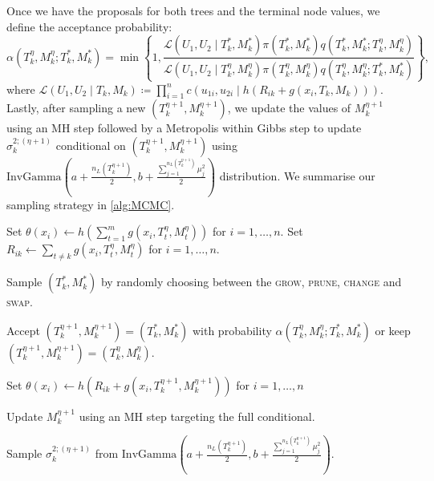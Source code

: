 \documentclass[
12pt]{article}
\begin{document}
	Once we have the proposals for both trees and the terminal node values, we define the acceptance probability:
	\begin{equation}\label{eq:acc:prob}
		\alpha\left(T_k^{\eta},M_k^{\eta};T_k^{\ast}, M_k^{\ast}\right)
		= \min\left\{1,\frac{\mathcal{L}(U_1,U_2\mid T_k^{\ast},M_k^{\ast})\pi(T_k^{\ast},M_k^{\ast})q\left(T_k^{\ast}, M_k^{\ast};T_k^{\eta},M_k^{\eta}\right)}
		{\mathcal{L}(U_1,U_2\mid T_k^{\eta},M_k^{\eta})\pi(T_k^{\eta},M_k^{\eta}) q\left(T_k^{\eta},M_k^{\eta};T_k^{\ast}, M_k^{\ast}\right)}\right\},
	\end{equation}
	where $\mathcal{L}(U_1,U_2\mid T_k, M_{k})\coloneqq \prod_{i=1}^{n}c\left(u_{1i},u_{2i}\mid h\left(R_{ik}+g(x_i, T_k, M_k)\right)\right)$. Lastly, after sampling a new $(T_k^{\eta+1},M_k^{\eta+1})$, we update the values of $M_k^{\eta+1}$ using an MH step followed by a Metropolis within Gibbs step to update $\sigma_{k}^{2;(\eta+1)}$ conditional on $(T_k^{\eta+1},M_k^{\eta+1})$ using $\text{InvGamma}\left(a+\frac{n_L\left(T_k^{\eta+1}\right)}{2} , b + \frac{\sum_{j=1}^{n_L\left(T_k^{\eta+1}\right)}\mu_j^2}{2}\right)$ distribution. We summarise our sampling strategy in \cref{alg:MCMC}.
	
	\begin{algorithm}[h]
		\caption{$(\eta+1)$-th iteration MCMC sampling}\label{alg:MCMC}
		\begin{algorithmic}[1]
			\State Set $\theta(x_i) \leftarrow h\left(\sum_{t=1}^{m} g(x_i, T_t^{\eta},M_t^{\eta})\right)$ for $i = 1, \ldots, n$.
			\State Set $R_{ik} \leftarrow \sum_{t\not=k}g(x_i, T_t^{\eta},M_t^{\eta})$ for $i = 1, \ldots, n$.
			
			\State Sample $(T_k^{\ast}, M_k^{\ast})$ by randomly choosing between the \textsc{grow}, \textsc{prune}, \textsc{change} and \textsc{swap}.
			
			\State Accept $\left(T_k^{\eta+1}, M_k^{\eta+1}\right)=\left(T_k^{\ast}, M_k^{\ast}\right)$ with probability $\alpha\left(T_k^{\eta},M_k^{\eta};T_k^{\ast}, M_k^{\ast}\right)$ or keep $\left(T_k^{\eta+1}, M_k^{\eta+1}\right)=\left(T_k^{\eta},M_k^{\eta}\right)$.
			
			\State Set $\theta(x_i) \leftarrow h\left(R_{ik} + g\left(x_i, T_k^{\eta+1}, M_k^{\eta+1}\right)\right)$ for $i = 1, \ldots, n$
			
			\State Update $M_k^{\eta+1}$ using an MH step targeting the full conditional.
			
			\State Sample $\sigma_{k}^{2;(\eta+1)}$ from $\text{InvGamma}\left(a+\frac{n_L\left(T_k^{\eta+1}\right)}{2} , b + \frac{\sum_{j=1}^{n_L\left(T_k^{\eta+1}\right)}\mu_j^2}{2}\right)$.
			\EndFor
		\end{algorithmic}
	\end{algorithm}
	
\end{document}
